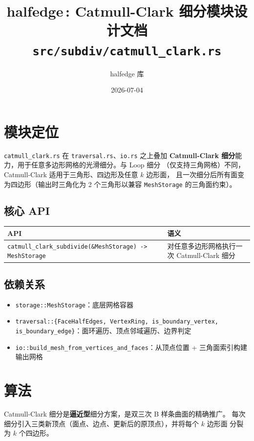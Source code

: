 \documentclass[11pt,a4paper]{article}
\title{\textbf{halfedge\,: Catmull-Clark 细分模块设计文档} \\ \large \texttt{src/subdiv/catmull\_clark.rs}}
\author{halfedge 库}
\date{2026-07-04}
\begin{document}
\maketitle
\tableofcontents

\section{模块定位}

\texttt{catmull\_clark.rs} 在 \texttt{traversal.rs}、\texttt{io.rs} 之上叠加
\textbf{Catmull-Clark 细分}能力，用于任意多边形网格的光滑细分。与 Loop 细分
（仅支持三角网格）不同，Catmull-Clark 适用于三角形、四边形及任意 $k$ 边形面，
且一次细分后所有面变为四边形（输出时三角化为 2 个三角形以兼容
\texttt{MeshStorage} 的三角面约束）。

\subsection{核心 API}

\begin{center}
\begin{tabular}{@{}ll@{}}
  \toprule
  \textbf{API} & \textbf{语义} \\
  \midrule
  \texttt{catmull\_clark\_subdivide(\&MeshStorage) -> MeshStorage} & 对任意多边形网格执行一次 Catmull-Clark 细分 \\
  \bottomrule
\end{tabular}
\end{center}

\subsection{依赖关系}

\begin{itemize}
  \item \texttt{storage::MeshStorage}：底层网格容器
  \item \texttt{traversal::\{FaceHalfEdges, VertexRing, is\_boundary\_vertex, is\_boundary\_edge\}}：面环遍历、顶点邻域遍历、边界判定
  \item \texttt{io::build\_mesh\_from\_vertices\_and\_faces}：从顶点位置 + 三角面索引构建输出网格
\end{itemize}

\section{算法}

Catmull-Clark 细分是\textbf{逼近型}细分方案，是双三次 B 样条曲面的精确推广。
每次细分引入三类新顶点（面点、边点、更新后的原顶点），并将每个 $k$ 边形面
分裂为 $k$ 个四边形。
\end{document}
